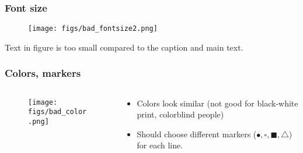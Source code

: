 \documentclass[hyperref={pdfpagelayout=SinglePage}]{beamer}
\begin{document}
\begin{frame}[fragile]
\frametitle{Font size}

% 
    \begin{figure}
    \centering
        \texttt{[image: figs/bad\_fontsize2.png]}
    \end{figure}
    Text in figure is too small compared to the caption and main text. 

\end{frame}

\begin{frame}[fragile]
\frametitle{Colors, markers}

\begin{columns}

    \begin{column}{0.5\textwidth}
    \begin{figure}
        \texttt{[image: figs/bad\_color.png]}
    \end{figure}
    \end{column}
    \begin{column}{0.4\textwidth}
    \begin{itemize}
        \item Colors look similar (not good for black-white print, colorblind people)
        \item Should choose different markers ($\bullet, \square,\blacksquare, \triangle$) for each line. 
    \end{itemize}

    \end{column}
\end{columns}
\end{frame}
\end{document}
